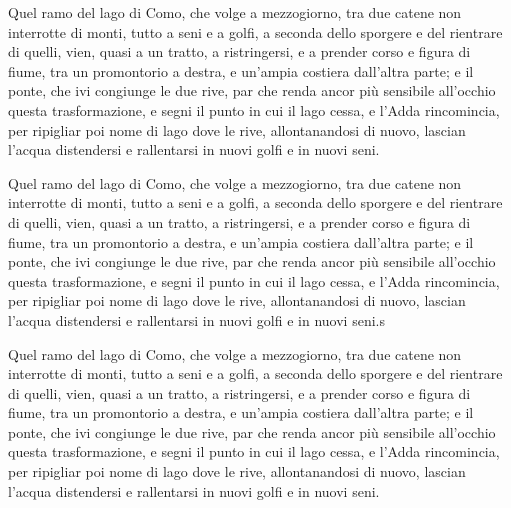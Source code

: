 \documentclass[11pt,a4paper]{book}
\begin{document}
\beginnumbering
\numberpstarttrue
\pstart
Quel ramo del lago di Como, che volge a mezzogiorno, tra due catene non interrotte di monti, tutto a seni e a golfi, a seconda dello sporgere e del rientrare di quelli, vien, quasi a un tratto, a ristringersi, e a prender corso e figura di fiume, tra un promontorio a destra, e un’ampia costiera dall’altra parte; e il ponte, che ivi congiunge le due rive, par che renda ancor più sensibile all’occhio questa trasformazione, e segni il punto in cui il lago cessa, e l’Adda rincomincia, per ripigliar poi nome di lago dove le rive, allontanandosi di nuovo, lascian l’acqua distendersi e rallentarsi in nuovi golfi e in nuovi seni.
\pend

\pausenumbering
\begin{pairs}
\begin{Leftside}
\resumenumbering
\numberpstartfalse
	\pstart\noindent Quel ramo del lago di Como, che volge a mezzogiorno, tra due catene non interrotte di monti, tutto a seni e a golfi, a seconda dello sporgere e del rientrare di quelli, vien, quasi a un tratto, a ristringersi, e a prender corso e figura di fiume, tra un promontorio a destra, e un’ampia costiera dall’altra parte; e il ponte, che ivi congiunge le due rive, par che renda ancor più sensibile all’occhio questa trasformazione, e segni il punto in cui il lago cessa, e l’Adda rincomincia, per ripigliar poi nome di lago dove le rive, allontanandosi di nuovo, lascian l’acqua distendersi e rallentarsi in nuovi golfi e in nuovi seni.s\pend
\pausenumbering
\end{Leftside}

\begin{Rightside}
\beginnumbering
\numberpstartfalse
	\pstart\noindent Quel ramo del lago di Como, che volge a mezzogiorno, tra due catene non interrotte di monti, tutto a seni e a golfi, a seconda dello sporgere e del rientrare di quelli, vien, quasi a un tratto, a ristringersi, e a prender corso e figura di fiume, tra un promontorio a destra, e un’ampia costiera dall’altra parte; e il ponte, che ivi congiunge le due rive, par che renda ancor più sensibile all’occhio questa trasformazione, e segni il punto in cui il lago cessa, e l’Adda rincomincia, per ripigliar poi nome di lago dove le rive, allontanandosi di nuovo, lascian l’acqua distendersi e rallentarsi in nuovi golfi e in nuovi seni.\pend
\pausenumbering
\end{Rightside}
\end{pairs}
\Columns

\numberpstarttrue
\resumenumbering
\end{document}

